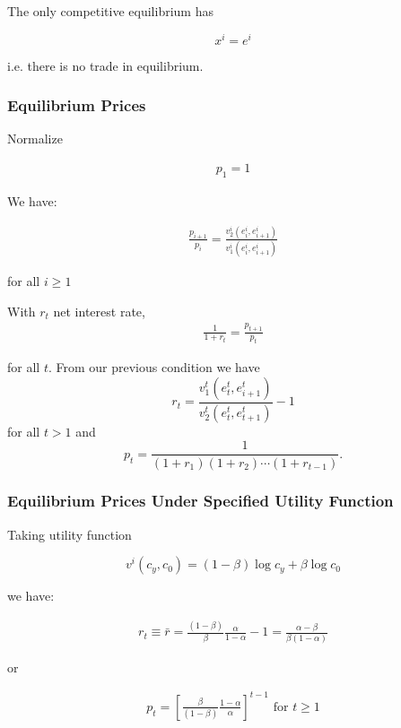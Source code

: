 \documentclass[10pt]{article}
\begin{document}
\begin{proposition} 
      The only competitive equilibrium has

      $$
      x^i=e^i
      $$

      i.e. there is no trade in equilibrium.
\end{proposition}

\subsubsection{Equilibrium Prices}

Normalize

\begin{align}
    p_1=1
\end{align}

We have:

\begin{align}
    \frac{p_{i+1}}{p_i}=\frac{v_2^i\left(e_i^i, e_{i+1}^i\right)}{v_1^i\left(e_i^i, e_{i+1}^i\right)}
\end{align}

for all $i \geq 1$

With $r_t$ net interest rate,
\begin{align}
    \frac{1}{1+r_t}=\frac{p_{t+1}}{p_t}
\end{align}

for all $t$. From our previous condition we have
$$
r_t=\frac{v_1^t\left(e_t^t, e_{i+1}^t\right)}{v_2^t\left(e_t^t, e_{t+1}^t\right)}-1
$$
for all $t>1$ and
$$
p_t=\frac{1}{\left(1+r_1\right)\left(1+r_2\right) \cdots\left(1+r_{t-1}\right)} .
$$

\subsubsection{Equilibrium Prices Under Specified Utility Function}

Taking utility function

$$
v^i\left(c_y, c_0\right)=(1-\beta) \log c_y+\beta \log c_0
$$

we have:

\begin{align}
    r_t \equiv \bar{r}=\frac{(1-\beta)}{\beta} \frac{\alpha}{1-\alpha}-1=\frac{\alpha-\beta}{\beta(1-\alpha)} 
\end{align}

or 

\begin{align}
    p_t=\left[\frac{\beta}{(1-\beta)} \frac{1-\alpha}{\alpha}\right]^{t-1} \text { for } t \geq 1
\end{align}
\end{document}

